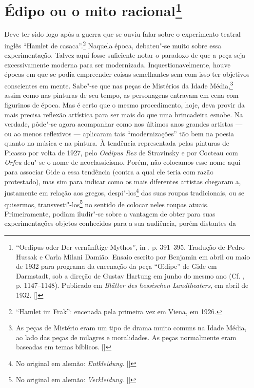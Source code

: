 \chapter{Édipo ou o mito racional\footnote[*]{``Oedipus oder Der vernünftige Mythos'', in , p. 391--395. Tradução de
  Pedro Hussak e Carla Milani Damião. Ensaio escrito
  por Benjamin em abril ou maio de 1932 para programa da encenação da
  peça ``\OE dipe'' de Gide em Darmstadt, sob a direção de Gustav Hartung
  em junho do mesmo ano (Cf. , p. 1147--1148). Publicado em
  \emph{Blätter des hessischen Landtheaters}, em abril de 1932. []}}

Deve ter sido logo após a guerra que se ouviu falar sobre o experimento
teatral inglês ``Hamlet de casaca''.\footnote{``Hamlet im Frak'':
  encenada pela primeira vez em Viena, em 1926. \versal{[N.~O.]}} Naquela época,
debateu"-se muito sobre essa experimentação. Talvez aqui fosse suficiente
notar o paradoxo de que a peça seja excessivamente moderna para ser
modernizada. Inquestionavelmente, houve épocas em que se podia
empreender coisas semelhantes sem com isso ter objetivos conscientes em mente.
Sabe"-se que nas peças de Mistérios da Idade Média,\footnote{As peças de Mistério eram um tipo de drama muito comuns na Idade Média, ao lado das peças de milagres e moralidades. As peças normalmente eram baseadas em temas bíblicos. []} assim como nas
pinturas de seu tempo, as personagens entravam em cena com figurinos de
época. Mas é certo que o mesmo procedimento, hoje, deva provir da mais
precisa reflexão artística para ser mais do que uma brincadeira esnobe.
Na verdade, pôde"-se agora acompanhar como nos últimos anos grandes
artistas --- ou ao menos reflexivos --- aplicaram tais ``modernizações''
tão bem na poesia quanto na música e na pintura. À tendência
representada pelas pinturas de Picasso por volta de 1927, pelo
\emph{Oedipus Rex} de Stravinsky e por Cocteau com \emph{Orfeu} deu"-se o
nome de neoclassicismo. Porém, não colocamos esse nome aqui para
associar Gide a essa tendência (contra a qual ele teria com razão
protestado), mas sim para indicar como os mais diferentes artistas
chegaram a, justamente em relação aos gregos, despi"-los\footnote{No original em alemão: \emph{Entkleidung}. []} das suas roupas tradicionais, ou se quisermos, transvesti"-los\footnote{No original em alemão: \emph{Verkleidung}. []} no sentido de colocar neles roupas atuais.
Primeiramente, podiam iludir"-se sobre a vantagem de
obter para suas experimentações objetos conhecidos para a sua audiência, porém distantes da
